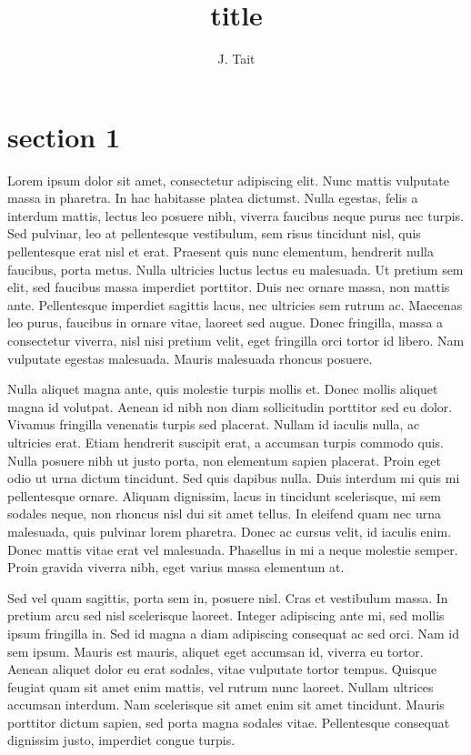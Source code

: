 \documentclass[11pt]{personal} %
\title{title}
\author{J. Tait}
\theoremstyle{plain}
\theoremstyle{remark}
\begin{document}
\maketitle

\section{section 1}

Lorem ipsum dolor sit amet, consectetur adipiscing elit. Nunc mattis vulputate massa in pharetra. In hac habitasse platea dictumst. Nulla egestas, felis a interdum mattis, lectus leo posuere nibh, viverra faucibus neque purus nec turpis. Sed pulvinar, leo at pellentesque vestibulum, sem risus tincidunt nisl, quis pellentesque erat nisl et erat. Praesent quis nunc elementum, hendrerit nulla faucibus, porta metus. Nulla ultricies luctus lectus eu malesuada. Ut pretium sem elit, sed faucibus massa imperdiet porttitor. Duis nec ornare massa, non mattis ante. Pellentesque imperdiet sagittis lacus, nec ultricies sem rutrum ac. Maecenas leo purus, faucibus in ornare vitae, laoreet sed augue. Donec fringilla, massa a consectetur viverra, nisl nisi pretium velit, eget fringilla orci tortor id libero. Nam vulputate egestas malesuada. Mauris malesuada rhoncus posuere.

Nulla aliquet magna ante, quis molestie turpis mollis et. Donec mollis aliquet magna id volutpat. Aenean id nibh non diam sollicitudin porttitor sed eu dolor. Vivamus fringilla venenatis turpis sed placerat. Nullam id iaculis nulla, ac ultricies erat. Etiam hendrerit suscipit erat, a accumsan turpis commodo quis. Nulla posuere nibh ut justo porta, non elementum sapien placerat. Proin eget odio ut urna dictum tincidunt. Sed quis dapibus nulla. Duis interdum mi quis mi pellentesque ornare. Aliquam dignissim, lacus in tincidunt scelerisque, mi sem sodales neque, non rhoncus nisl dui sit amet tellus. In eleifend quam nec urna malesuada, quis pulvinar lorem pharetra. Donec ac cursus velit, id iaculis enim. Donec mattis vitae erat vel malesuada. Phasellus in mi a neque molestie semper. Proin gravida viverra nibh, eget varius massa elementum at.

Sed vel quam sagittis, porta sem in, posuere nisl. Cras et vestibulum massa. In pretium arcu sed nisl scelerisque laoreet. Integer adipiscing ante mi, sed mollis ipsum fringilla in. Sed id magna a diam adipiscing consequat ac sed orci. Nam id sem ipsum. Mauris est mauris, aliquet eget accumsan id, viverra eu tortor. Aenean aliquet dolor eu erat sodales, vitae vulputate tortor tempus. Quisque feugiat quam sit amet enim mattis, vel rutrum nunc laoreet. Nullam ultrices accumsan interdum. Nam scelerisque sit amet enim sit amet tincidunt. Mauris porttitor dictum sapien, sed porta magna sodales vitae. Pellentesque consequat dignissim justo, imperdiet congue turpis.
\end{document}
